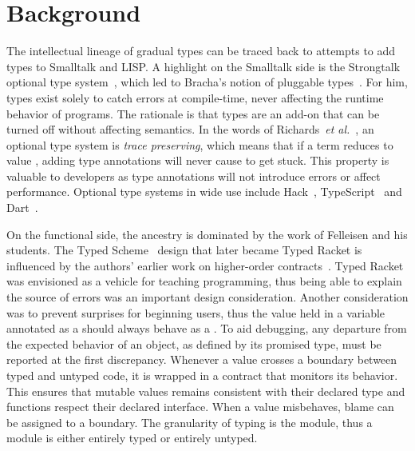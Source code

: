 \documentclass{tex/llncs}
\begin{document}
\section{Background}




\noindent The intellectual lineage of gradual types can be traced back to
attempts to add types to Smalltalk and LISP. A highlight on the Smalltalk
side is the Strongtalk optional type system~\cite{Bracha93}, which led to
Bracha's notion of pluggable types~\cite{pluggabletypes}. For him, types
exist solely to catch errors at compile-time, never affecting the runtime
behavior of programs. The rationale is that types are an add-on that can be
turned off without affecting semantics.  In the words of Richards~\emph{et
  al.}~\cite{ecoop15}, an optional type system is \emph{trace preserving},
which means that if a term \e reduces to value \a, adding type annotations
will never cause \e to get stuck. This property is valuable to developers as
type annotations will not introduce errors or affect performance.  Optional
type systems in wide use include Hack~\cite{hack13}, TypeScript~\cite{BAT14}
and Dart~\cite{dart13}.

On the functional side, the ancestry is dominated by the work of Felleisen
and his students.  The Typed Scheme~\cite{tf-popl08} design that later
became Typed Racket is influenced by the authors' earlier work on
higher-order contracts~\cite{ff-icfp02}. Typed Racket was envisioned as a
vehicle for teaching programming, thus being able to explain the source of
errors was an important design consideration. Another consideration was to
prevent surprises for beginning users, thus the value held in a variable
annotated as a \C should always behave as a \C. To aid debugging, any
departure from the expected behavior of an object, as defined by its
promised type, must be reported at the first discrepancy.  Whenever a value
crosses a boundary between typed and untyped code, it is wrapped in a
contract that monitors its behavior. This ensures that mutable values
remains consistent with their declared type and functions respect their
declared interface. When a value misbehaves, blame can be assigned to a
boundary. The granularity of typing is the module, thus a module is either
entirely typed or entirely untyped. 
\end{document}
